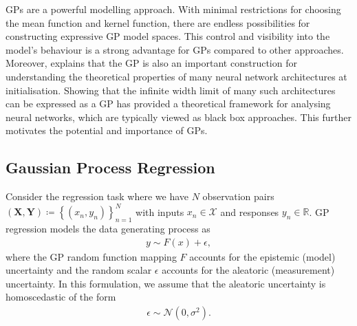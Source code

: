 \documentclass{article}
\numberwithin{equation}{section}
\begin{document}
GPs are a powerful modelling approach. With minimal restrictions for choosing the mean function and kernel function, there are endless possibilities for constructing expressive GP model spaces.
This control and visibility into the model's behaviour is a strong advantage for GPs compared to other approaches.
Moreover, \cite{novak2019neural} explains that the GP is also an important construction for understanding the theoretical properties of many neural network architectures at initialisation.
Showing that the infinite width limit of many such architectures can be expressed as a GP has provided a theoretical framework for analysing neural networks, which are typically viewed as black box approaches.
This further motivates the potential and importance of GPs.

\subsection{Gaussian Process Regression}
Consider the regression task where we have $N$ observation pairs $(\mathbf{X}, \mathbf{Y}) \coloneqq \left\{(x_n, y_n)\right\}_{n=1}^{N}$ with inputs $x_n \in \mathcal{X}$ and responses $y_n \in \mathbb{R}$. GP regression models the data generating process as
\begin{align}
    y \sim F(x) + \epsilon,
    \label{regression-data-uncertainties}
\end{align}
where the GP random function mapping $F$ accounts for the epistemic (model) uncertainty and the random scalar $\epsilon$ accounts for the aleatoric (measurement) uncertainty. In this formulation, we assume that the aleatoric uncertainty is homoscedastic of the form
\begin{align}
    \epsilon \sim \mathcal{N} \left(0, \sigma^2\right).
    \label{aleotric-uncertainty}
\end{align}
\end{document}

